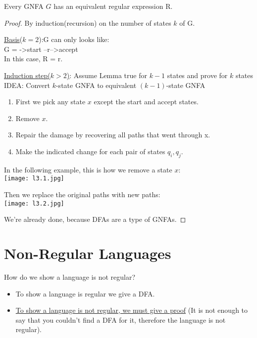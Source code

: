 \begin{lemma}
    Every GNFA \(G\) has an equivalent regular expression R.
\end{lemma}
\begin{proof}
    By induction(recursion) on the number of states \(k\) of G. 

    \hfill\break
    \underline{Basis}(\(k =2\)):G can only looks like:\\ G = ->start --r-->accept\\
    In this case, R = r.

    \hfill\break
    \underline{Induction step(\(k > 2\))}: Assume Lemma true for \(k - 1\) states and prove for \(k\) states \\
    IDEA: Convert \(k\)-state GNFA to equivalent \((k - 1)\)-state GNFA  
    \\
    \begin{enumerate}
        \item First we pick any state \(x\) except the start and accept states.
        \item Remove \(x\).
        \item Repair the damage by recovering all paths that went through x. 
        \item Make the indicated change for each pair of states \(q_i, q_j\).
    \end{enumerate}

    In the following example, this is how we remove a state \(x\):\\
    \texttt{[image: l3.1.jpg]}

    Then we replace the original paths with new paths:\\
    \texttt{[image: l3.2.jpg]}

    We're already done, because DFAs are a type of GNFAs.
\end{proof}


\section{Non-Regular Languages}
How do we show a language is not regular?
\begin{itemize}
    \item To show a language is regular we give a DFA.
    \item \underline{To show a language is not regular, we must give a proof} (It is not enough to say that you couldn't find a DFA for it, therefore the language is not regular).
\end{itemize}

